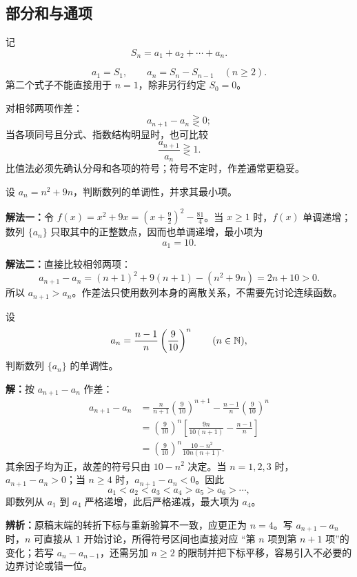 \subsection{部分和与通项}

记
\[
  S_n=a_1+a_2+\cdots+a_n.
\]

\begin{lawbox}[由前 $n$ 项和恢复通项]
  \[
    a_1=S_1,\qquad a_n=S_n-S_{n-1}\quad(n\ge 2).
  \]
  第二个式子不能直接用于 $n=1$，除非另行约定 $S_0=0$。
\end{lawbox}

\begin{corollarybox}[判断单调性的两个入口]
  对相邻两项作差：
  \[
    a_{n+1}-a_n\gtreqless 0;
  \]
  当各项同号且分式、指数结构明显时，也可比较
  \[
    \frac{a_{n+1}}{a_n}\gtreqless 1.
  \]
  比值法必须先确认分母和各项的符号；符号不定时，作差通常更稳妥。
\end{corollarybox}

\begin{examplebox}
  设 $a_n=n^2+9n$，判断数列的单调性，并求其最小项。

  \textbf{解法一：}令 $f(x)=x^2+9x=(x+\tfrac92)^2-\tfrac{81}{4}$。当
  $x\ge1$ 时，$f(x)$ 单调递增；数列 $\{a_n\}$ 只取其中的正整数点，因而也单调递增，最小项为
  \[
    a_1=10.
  \]

  \textbf{解法二：}直接比较相邻两项：
  \[
    a_{n+1}-a_n=(n+1)^2+9(n+1)-(n^2+9n)=2n+10>0.
  \]
  所以 $a_{n+1}>a_n$。作差法只使用数列本身的离散关系，不需要先讨论连续函数。
\end{examplebox}

\begin{examplebox}
  设
  \[
    a_n=\frac{n-1}{n}\left(\frac9{10}\right)^n
    \qquad(n\in\mathbb{N}),
  \]
  判断数列 $\{a_n\}$ 的单调性。

  \textbf{解：}按 $a_{n+1}-a_n$ 作差：
  \begin{align*}
    a_{n+1}-a_n
      &=\frac{n}{n+1}\left(\frac9{10}\right)^{n+1}
        -\frac{n-1}{n}\left(\frac9{10}\right)^n\\
      &=\left(\frac9{10}\right)^n
        \left[\frac{9n}{10(n+1)}-\frac{n-1}{n}\right]\\
      &=\left(\frac9{10}\right)^n
        \frac{10-n^2}{10n(n+1)}.
  \end{align*}
  其余因子均为正，故差的符号只由 $10-n^2$ 决定。当 $n=1,2,3$ 时，
  $a_{n+1}-a_n>0$；当 $n\ge4$ 时，$a_{n+1}-a_n<0$。因此
  \[
    a_1<a_2<a_3<a_4>a_5>a_6>\cdots,
  \]
  即数列从 $a_1$ 到 $a_4$ 严格递增，此后严格递减，最大项为 $a_4$。

  \textbf{辨析：}原稿末端的转折下标与重新验算不一致，应更正为 $n=4$。写
  $a_{n+1}-a_n$ 时，$n$ 可直接从 $1$ 开始讨论，所得符号区间也直接对应
  “第 $n$ 项到第 $n+1$ 项”的变化；若写 $a_n-a_{n-1}$，还需另加 $n\ge2$
  的限制并把下标平移，容易引入不必要的边界讨论或错一位。
\end{examplebox}

